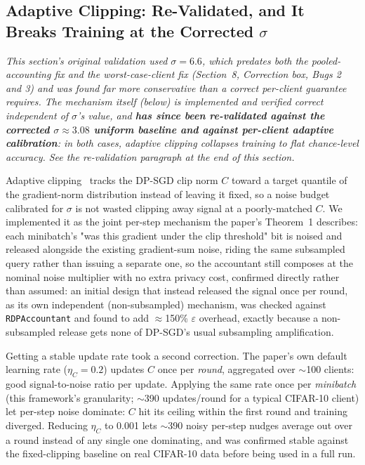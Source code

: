 \documentclass[12pt,a4paper]{article}
\begin{document}
\subsection{Adaptive Clipping: Re-Validated, and It Breaks Training at the Corrected $\sigma$}
\label{sec:adaptive-clipping}

\emph{This section's original validation used $\sigma=6.6$, which
predates both the pooled-accounting fix and the worst-case-client fix
(Section~8, Correction box, Bugs 2 and 3) and was found far more
conservative than a correct per-client guarantee requires. The
mechanism itself (below) is implemented and verified correct
independent of $\sigma$'s value, and \textbf{has since been
re-validated against the corrected $\sigma\approx3.08$ uniform baseline
and against per-client adaptive calibration}: in both cases, adaptive
clipping collapses training to flat chance-level accuracy. See the
re-validation paragraph at the end of this section.}

Adaptive clipping~\cite{andrew2021} tracks the DP-SGD clip norm $C$ toward
a target quantile of the gradient-norm distribution instead of leaving it
fixed, so a noise budget calibrated for $\sigma$ is not wasted clipping
away signal at a poorly-matched $C$. We implemented it as the joint
per-step mechanism the paper's Theorem~1 describes: each minibatch's
"was this gradient under the clip threshold" bit is noised and released
alongside the existing gradient-sum noise, riding the same subsampled
query rather than issuing a separate one, so the accountant still composes
at the nominal noise multiplier with no extra privacy cost, confirmed
directly rather than assumed: an initial design that instead released the
signal once per round, as its own independent (non-subsampled) mechanism,
was checked against \texttt{RDPAccountant} and found to add
$\approx$150\% $\varepsilon$ overhead, exactly because a non-subsampled
release gets none of DP-SGD's usual subsampling amplification.

Getting a stable update rate took a second correction. The paper's own
default learning rate ($\eta_C=0.2$) updates $C$ once per \emph{round},
aggregated over $\sim$100 clients: good signal-to-noise ratio per
update. Applying the same rate once per \emph{minibatch} (this framework's
granularity; $\sim$390 updates/round for a typical CIFAR-10 client) let
per-step noise dominate: $C$ hit its ceiling within the first round and
training diverged. Reducing $\eta_C$ to 0.001 lets $\sim$390 noisy
per-step nudges average out over a round instead of any single one
dominating, and was confirmed stable against the fixed-clipping baseline
on real CIFAR-10 data before being used in a full run.
\end{document}

